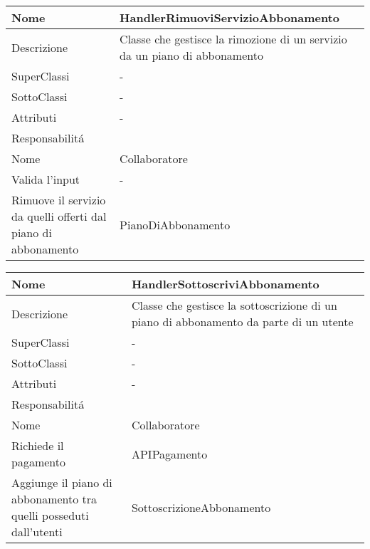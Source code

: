 \begin{center}
    \begin{longtable}{ |p{3cm}|p{3cm}|p{3cm}|p{3cm}| }
        \hline
        Nome & \multicolumn{3}{|p{9cm}|}{HandlerRimuoviServizioAbbonamento} \\\hline
        Descrizione & \multicolumn{3}{|p{9cm}|}{Classe che gestisce la rimozione di un servizio da un piano di abbonamento} \\\hline
        SuperClassi & \multicolumn{3}{|p{9cm}|}{-} \\\hline
        SottoClassi & \multicolumn{3}{|p{9cm}|}{-} \\\hline
        Attributi & \multicolumn{3}{|p{9cm}|}{-} \\\hline
        \multicolumn{4}{|p{12cm}|}{Responsabilit\'a} \\\hline
        \multicolumn{2}{|p{6cm}|}{Nome} & \multicolumn{2}{|p{6cm}|}{Collaboratore} \\\hline
        \multicolumn{2}{|p{6cm}|}{Valida l'input} & \multicolumn{2}{|p{6cm}|}{-} \\\hline
        \multicolumn{2}{|p{6cm}|}{Rimuove il servizio da quelli offerti dal piano di abbonamento} & \multicolumn{2}{|p{6cm}|}{PianoDiAbbonamento} \\\hline
    \end{longtable}
\end{center}


\begin{center}
    \begin{longtable}{ |p{3cm}|p{3cm}|p{3cm}|p{3cm}| }
        \hline
        Nome & \multicolumn{3}{|p{9cm}|}{HandlerSottoscriviAbbonamento} \\\hline
        Descrizione & \multicolumn{3}{|p{9cm}|}{Classe che gestisce la sottoscrizione di un piano di abbonamento da parte di un utente} \\\hline
        SuperClassi & \multicolumn{3}{|p{9cm}|}{-} \\\hline
        SottoClassi & \multicolumn{3}{|p{9cm}|}{-} \\\hline
        Attributi & \multicolumn{3}{|p{9cm}|}{-} \\\hline
        \multicolumn{4}{|p{12cm}|}{Responsabilit\'a} \\\hline
        \multicolumn{2}{|p{6cm}|}{Nome} & \multicolumn{2}{|p{6cm}|}{Collaboratore} \\\hline
        \multicolumn{2}{|p{6cm}|}{Richiede il pagamento} & \multicolumn{2}{|p{6cm}|}{APIPagamento} \\\hline
        \multicolumn{2}{|p{6cm}|}{Aggiunge il piano di abbonamento tra quelli posseduti dall'utenti} & \multicolumn{2}{|p{6cm}|}{SottoscrizioneAbbonamento} \\\hline
    \end{longtable}
\end{center}

